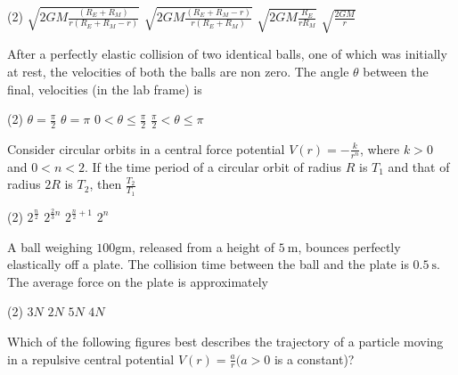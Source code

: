 \begin{enumerate}
\begin{minipage}{\textwidth}
\end{minipage}
\begin{tasks}(2)
	\task[\textbf{A.}] $\sqrt{2 G M \frac{\left(R_{E}+R_{M}\right)}{r\left(R_{E}+R_{M}-r\right)}}$
	\task[\textbf{B.}]$\sqrt{2 G M \frac{\left(R_{E}+R_{M}-r\right)}{r\left(R_{E}+R_{M}\right)}}$
	\task[\textbf{C.}]$\sqrt{2 G M \frac{R_{E}}{r R_{M}}}$
	\task[\textbf{D.}]$\sqrt{\frac{2 G M}{r}}$
\end{tasks}
\begin{minipage}{\textwidth}
	\item After a perfectly elastic collision of two identical balls, one of which was initially at rest, the velocities of both the balls are non zero. The angle $\theta$ between the final, velocities (in the lab frame) is
\end{minipage}
\begin{tasks}(2)
	\task[\textbf{A.}] $\theta=\frac{\pi}{2}$
	\task[\textbf{B.}]$\theta=\pi$
	\task[\textbf{C.}]$0<\theta \leq \frac{\pi}{2}$
	\task[\textbf{D.}] $\frac{\pi}{2}<\theta \leq \pi$
\end{tasks}
\begin{minipage}{\textwidth}
	\item Consider circular orbits in a central force potential $V(r)=-\frac{k}{r^{n}}$, where $k>0$ and $0<n<2$. If the time period of a circular orbit of radius $R$ is $T_{1}$ and that of radius $2 R$ is $T_{2}$, then $\frac{T_{2}}{T_{1}}$
\end{minipage}
\begin{tasks}(2)
	\task[\textbf{A.}] $2^{\frac{n}{2}}$
	\task[\textbf{B.}]$2^{\frac{2}{3} n}$
	\task[\textbf{C.}]$2^{\frac{n}{2}+1}$
	\task[\textbf{D.}]$2^{n}$
\end{tasks}
\begin{minipage}{\textwidth}
	\item A ball weighing $100 \mathrm{gm}$, released from a height of $5 \mathrm{~m}$, bounces perfectly elastically off a plate. The collision time between the ball and the plate is $0.5 \mathrm{~s}$. The average force on the plate is approximately
\end{minipage}
\begin{tasks}(2)
	\task[\textbf{A.}] $3 N$
	\task[\textbf{B.}]$2 N$
	\task[\textbf{C.}]$5 N$
	\task[\textbf{D.}]$4 N$
\end{tasks}
\begin{minipage}{\textwidth}
	\item Which of the following figures best describes the trajectory of a particle moving in a repulsive central potential $V(r)=\frac{a}{r}(a>0$ is a constant)?

\end{minipage}
\end{enumerate}

